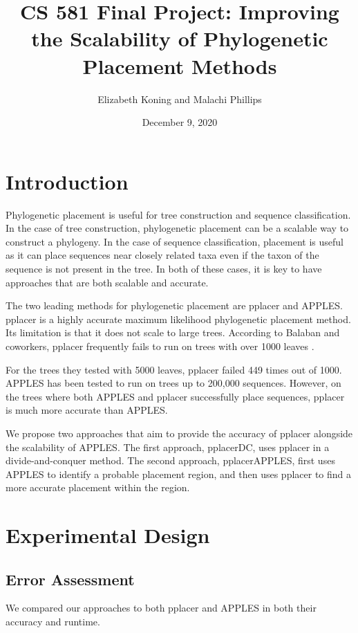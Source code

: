\documentclass[10pt]{article}
\title{CS 581 Final Project: Improving the Scalability of Phylogenetic Placement Methods}
\author{Elizabeth Koning and Malachi Phillips}
\date{December 9, 2020}
\begin{document}
\vspace{-1cm}
\maketitle

\section{Introduction}

Phylogenetic placement is useful for tree construction and sequence classification. In the case of tree construction, phylogenetic placement can be a scalable way to construct a phylogeny. In the case of sequence classification, placement is useful as it can place sequences near closely related taxa even if the taxon of the sequence is not present in the tree. In both of these cases, it is key to have approaches that are both scalable and accurate.

The two leading methods for phylogenetic placement are pplacer and APPLES. pplacer \cite{matsen_pplacer_2010} is a highly accurate maximum likelihood phylogenetic placement method. Its limitation is that it does not scale to large trees. According to Balaban and coworkers,  pplacer frequently fails to run on trees with over 1000 leaves \cite{balaban_apples_2020}.

For the trees they tested with 5000 leaves, pplacer failed 449 times out of 1000. APPLES has been tested to run on trees up to 200,000 sequences. However, on the trees where both APPLES and pplacer successfully place sequences, pplacer is much more accurate than APPLES.

We propose two approaches that aim to provide the accuracy of pplacer alongside the scalability of APPLES. The first approach, pplacerDC, uses pplacer in a divide-and-conquer method. The second approach, pplacerAPPLES, first uses APPLES to identify a probable placement region, and then uses pplacer to find a more accurate placement within the region.

\section{Experimental Design}

\subsection{Error Assessment}

We compared our approaches to both pplacer and APPLES in both their accuracy and runtime.
\end{document}
